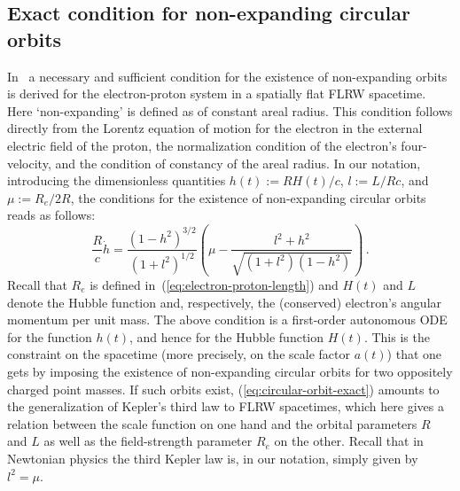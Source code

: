 \documentclass
[rmp,aps,twocolumn,showpacs,preprintnumbers,amsmath,amssymb]{revtex4}
\theoremstyle{plain}
\theoremstyle{definition}
\theoremstyle{remark}
\begin{document}
\subsection{Exact condition for non-expanding circular orbits}
\label{sec:nonExpCirOrbitsFLRW}
%
In~\cite{Bonnor:1999} a necessary and sufficient condition for the 
existence of non-expanding orbits is derived for the electron-proton 
system in a spatially flat FLRW spacetime. Here `non-expanding' is 
defined as of constant areal radius. This condition follows directly from the 
Lorentz equation of motion for the electron in the external electric field of 
the proton, the normalization condition of the electron's four-velocity, and 
the condition of constancy of the areal radius. In our notation, introducing 
the dimensionless quantities $h(t):=RH(t)/c$, $l:=L/Rc$, and $\mu:=R_e/2R$, 
the conditions for the existence of non-expanding circular orbits reads as 
follows:
%
\begin{equation}\label{eq:circular-orbit-exact}
  \frac{R}{c} \dot h = \frac{(1-h^2)^{3/2}}{(1+l^2)^{1/2}}
  \left( \mu - \frac{l^2+h^2}{\sqrt{(1+l^2)(1-h^2)}} \right) \,.
\end{equation}
%
Recall that $R_e$ is defined in~(\ref{eq:electron-proton-length}) and $H(t)$ 
and $L$ denote the Hubble function and, respectively, the (conserved) 
electron's angular momentum per unit mass. 
The above condition is a first-order autonomous ODE for the function $h(t)$, 
and hence for the Hubble function $H(t)$. This is the constraint on the 
spacetime (more precisely, on the scale factor $a(t)$) that one gets by 
imposing the existence of non-expanding circular orbits for two oppositely 
charged point masses.  If such orbits exist, (\ref{eq:circular-orbit-exact}) 
amounts to the generalization of Kepler's third law to FLRW spacetimes, which 
here gives a relation between the scale function on one hand and the orbital 
parameters $R$ and $L$ as well as the field-strength parameter $R_e$ on the 
other. Recall that in Newtonian physics the third Kepler law is, in our 
notation, simply given by $l^2=\mu$. 
\end{document}
